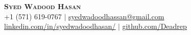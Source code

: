 \begin{center}
	\textbf{\Huge \scshape Syed Wadood Hasan} \\ \vspace{3.5pt}
    \small{+1 (571) 619-0767} $|$
    \href{mailto:syedwadoodhassan@gmail.com}{\underline{syedwadoodhassan@gmail.com}}
	\href{https://www.linkedin.com/in/syedwadoodhasan-5a7bb21a8}{\underline{linkedin.com/in/syedwadoodhasan/}} $|$
	\href{https://github.com/Deadrep}{\underline{github.com/Deadrep}}
\end{center}